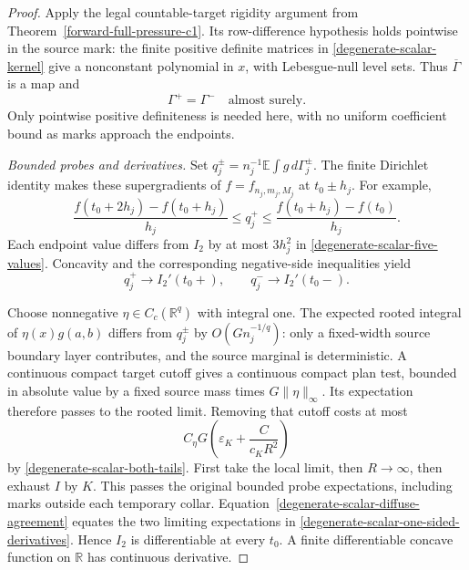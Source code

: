 \documentclass[11pt,reqno]{amsart}
\theoremstyle{definition}
\theoremstyle{remark}
\numberwithin{equation}{section}
\newcommand{\R}{\mathbb R}
\newcommand{\E}{\mathbb E}
\begin{document}
\begin{proof}
Apply the legal countable-target rigidity argument from
Theorem~\ref{forward-full-pressure-c1}. Its row-difference hypothesis
holds pointwise in the source mark: the finite positive definite
matrices in \eqref{degenerate-scalar-kernel} give a nonconstant
polynomial in \(x\), with Lebesgue-null level sets. Thus
\(\overline\Gamma\) is a map and
\begin{equation}
\label{degenerate-scalar-diffuse-agreement}
                         \Gamma^+=\Gamma^-
                         \quad\text{almost surely}.
\end{equation}
Only pointwise positive definiteness is needed here, with no uniform
coefficient bound as marks approach the endpoints.

\emph{Bounded probes and derivatives.}
Set \(q_j^\pm=n_j^{-1}\E\int g\,d\Gamma_j^\pm\). The finite
Dirichlet identity makes these supergradients of
\(f=f_{n_j,m_j,M_j}\) at \(t_0\pm h_j\). For example,
\[
 \frac{f(t_0+2h_j)-f(t_0+h_j)}{h_j}
 \le q_j^+\le
 \frac{f(t_0+h_j)-f(t_0)}{h_j}.
\]
Each endpoint value differs from \(I_2\) by at most \(3h_j^2\)
in \eqref{degenerate-scalar-five-values}. Concavity and the
corresponding negative-side inequalities yield
\begin{equation}
\label{degenerate-scalar-one-sided-derivatives}
 q_j^+\longrightarrow I_2'(t_0+),\qquad
 q_j^-\longrightarrow I_2'(t_0-).
\end{equation}

Choose nonnegative \(\eta\in C_c(\R^q)\) with integral one.
The expected rooted integral of \(\eta(x)g(a,b)\) differs from
\(q_j^\pm\) by \(O(Gn_j^{-1/q})\): only a fixed-width source
boundary layer contributes, and the source marginal is deterministic.
A continuous compact target cutoff gives a continuous compact plan
test, bounded in absolute value by a fixed source mass times
\(G\|\eta\|_\infty\). Its expectation therefore passes to the
rooted limit. Removing that cutoff costs at most
\begin{equation}
\label{degenerate-scalar-probe-tail}
                 C_\eta G\left(\varepsilon_K+
                                      \frac{C}{c_KR^2}\right)
\end{equation}
by \eqref{degenerate-scalar-both-tails}. First take the local limit,
then \(R\to\infty\), then exhaust \(I\) by \(K\). This passes
the original bounded probe expectations, including marks outside
each temporary collar. Equation~\eqref{degenerate-scalar-diffuse-agreement}
equates the two limiting expectations in
\eqref{degenerate-scalar-one-sided-derivatives}. Hence \(I_2\) is
differentiable at every \(t_0\). A finite differentiable concave
function on \(\R\) has continuous derivative.
\end{proof}
\end{document}
